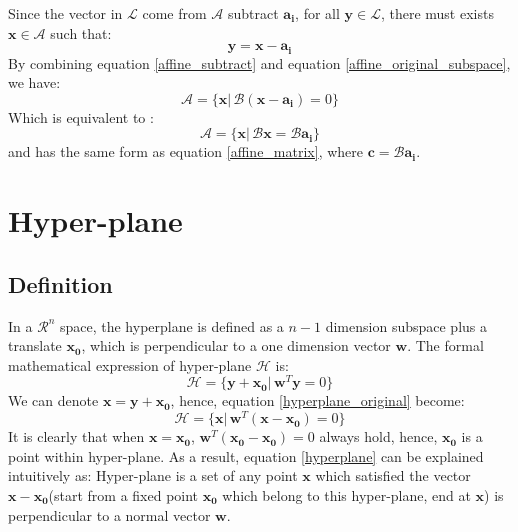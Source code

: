 \documentclass[10pt,a4paper]{article}
\begin{document}
Since the vector in $\mathcal{L}$ come from $\mathcal{A}$ subtract $\mathbf{a_{i}}$, for all $\mathbf{y} \in \mathcal{L}$, there must exists $\mathbf{x} \in \mathcal{A}$ such that: 
\begin{equation}
	\mathbf{y} = \mathbf{x} - \mathbf{a_{i}}
	\label{affine_subtract}
\end{equation}
By combining equation \ref{affine_subtract} and equation \ref{affine_original_subspace}, we have:
\begin{equation*}
	\mathcal{A} = \{ \mathbf{x} |\, \mathcal{B} (\mathbf{x} - \mathbf{a_{i}}) = 0 \}
\end{equation*}
Which is equivalent to :
\begin{equation*}
	\mathcal{A} = \{ \mathbf{x} |\, \mathcal{B} \mathbf{x} = \mathcal{B} \mathbf{a_{i}} \}
\end{equation*}
and has the same form as equation \ref{affine_matrix}, where $\mathbf{c} = \mathcal{B} \mathbf{a_{i}}$.

\section{Hyper-plane}
\subsection{Definition}
In a $\mathcal{R}^{n}$ space, the hyperplane is defined as a $n - 1$ dimension subspace plus a translate $\mathbf{x_{0}}$, which is perpendicular to a one dimension vector $\mathbf{w}$. The formal mathematical expression of hyper-plane $\mathcal{H}$ is:
\begin{equation}
	\mathcal{H} = \{ \mathbf{y} + \mathbf{x_{0}} |\, \mathbf{w}^{T}\mathbf{y} = 0  \}
	\label{hyperplane_original}
\end{equation}
We can denote $\mathbf{x} = \mathbf{y} + \mathbf{x_{0}}$, hence, equation \ref{hyperplane_original} become:
\begin{equation}
	\mathcal{H} = \{ \mathbf{x} |\, \mathbf{w}^{T}(\mathbf{x} - \mathbf{x_{0}}) = 0 \}
	\label{hyperplane}
\end{equation}
It is clearly that when $\mathbf{x} = \mathbf{x_{0}}$, $\mathbf{w}^{T} (\mathbf{x_{0}} - \mathbf{x_{0}}) = 0$ always hold, hence, $\mathbf{x_{0}}$ is a point within hyper-plane. As a result, equation \ref{hyperplane} can be explained intuitively as: Hyper-plane is a set of any point $\mathbf{x}$ which satisfied the vector $\mathbf{x} - \mathbf{x_{0}}$(start from a fixed point $\mathbf{x_{0}}$ which belong to this hyper-plane, end at $\mathbf{x}$) is perpendicular to a normal vector $\mathbf{w}$.
\end{document}
